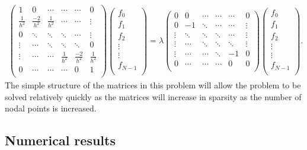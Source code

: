 \documentclass[a4paper, 12pt, twoside, openright]{article}
\numberwithin{equation}{section}
\begin{document}
\begin{gather}
\begin{pmatrix}
1 & 0 & \cdots & \cdots & \cdots & 0 \\
\frac{1}{h^2} & \frac{-2}{h^2} & \frac{1}{h^2} & \cdots & \cdots & \vdots \\
0 & \ddots & \ddots & \ddots & \cdots & \vdots \\
\vdots & \cdots & \ddots & \ddots & \ddots & 0 \\ 
\vdots & \cdots & \cdots & \frac{1}{h^2} & \frac{-2}{h^2} & \frac{1}{h^2} \\
0 & \cdots & \cdots & \cdots & 0 & 1 \\
\end{pmatrix} 
\begin{pmatrix}
f_0 \\
f_1 \\
f_2 \\
\vdots \\
\vdots \\
f_{N-1} \\ 
\end{pmatrix}
= \lambda 
\begin{pmatrix}
0 & 0 & \cdots & \cdots & \cdots & 0 \\
0 & -1 & \ddots & \cdots &\cdots &  \vdots \\
\vdots & \ddots & \ddots & \ddots & \cdots & \vdots \\
\vdots & \cdots &\ddots & \ddots & \ddots & \vdots \\
\vdots & \cdots & \cdots & \ddots & -1 & 0 \\
0 & \cdots & \cdots & \cdots & 0 & 0 \\
\end{pmatrix}
\begin{pmatrix}
f_0 \\
f_1 \\
f_2 \\
\vdots \\
\vdots \\
f_{N-1} \\ 
\end{pmatrix}.
\end{gather}
The simple structure of the matrices in this problem will allow the problem to be solved relatively quickly as the matrices will increase in sparsity as the number of nodal points is increased.

\subsection{Numerical results} 
\end{document}
